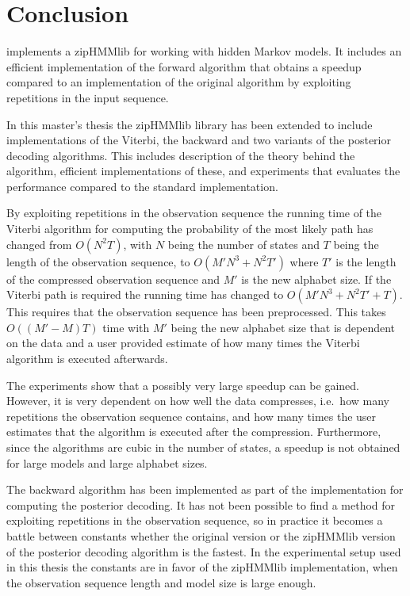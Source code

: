 
\chapter{Conclusion}
\label{cha:conclusion}

\citet{sand2013ziphmmlib} implements a zipHMMlib for working with hidden Markov
models. It includes an efficient implementation of the forward algorithm that
obtains a speedup compared to an implementation of the original algorithm by
exploiting repetitions in the input sequence.

In this master's thesis the zipHMMlib library has been extended to include
implementations of the Viterbi, the backward and two variants of the posterior
decoding algorithms. This includes description of the theory behind the
algorithm, efficient implementations of these, and experiments that evaluates
the performance compared to the standard implementation.

By exploiting repetitions in the observation sequence the running time of the
Viterbi algorithm for computing the probability of the most likely path has
changed from $O(N^2 T)$, with $N$ being the number of states and $T$ being the
length of the observation sequence, to $O(M' N^3 + N^2 T')$ where $T'$ is the
length of the compressed observation sequence and $M'$ is the new alphabet
size. If the Viterbi path is required the running time has changed to
$O(M' N^3 + N^2 T' + T)$. This requires that the observation sequence has been
preprocessed. This takes $O((M' - M) T)$ time with $M'$ being the new alphabet size
that is dependent on the data and a user provided estimate of how many times
the Viterbi algorithm is executed afterwards.

The experiments show that a possibly very large speedup can be gained. However,
it is very dependent on how well the data compresses, i.e.\ how many repetitions
the observation sequence contains, and how many times the user estimates that the
algorithm is executed after the compression. Furthermore, since the
algorithms are cubic in the number of states, a speedup is not obtained for
large models and large alphabet sizes.

The backward algorithm has been implemented as part of the implementation for
computing the posterior decoding. It has not been possible to find a method for
exploiting repetitions in the observation sequence, so in practice it becomes a
battle between constants whether the original version or the zipHMMlib version
of the posterior decoding algorithm is the fastest. In the experimental setup
used in this thesis the constants are in favor of the zipHMMlib implementation,
when the observation sequence length and model size is large enough.

